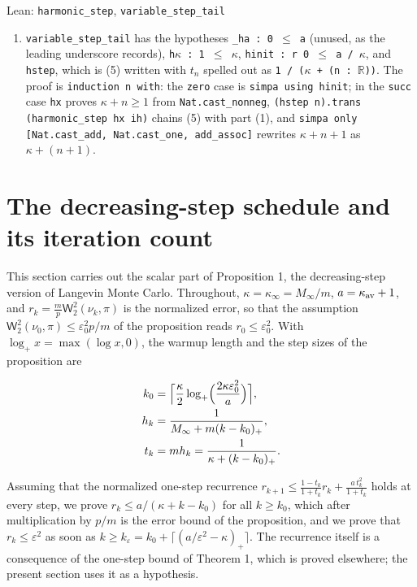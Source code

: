 \documentclass[11pt,a4paper]{report}
\begin{document}
\begin{leanbox}{Lean: \texttt{harmonic\_\allowbreak{}step}, \texttt{variable\_\allowbreak{}step\_\allowbreak{}tail}}
\begin{enumerate}
\item \texttt{variable\_\allowbreak{}step\_\allowbreak{}tail} has the hypotheses \texttt{\_\allowbreak{}ha : 0 \ensuremath{\le} a} (unused, as the leading underscore records), \texttt{h\ensuremath{\kappa} : 1 \ensuremath{\le} \ensuremath{\kappa}}, \texttt{hinit : r 0 \ensuremath{\le} a /\allowbreak{} \ensuremath{\kappa}}, and \texttt{hstep}, which is (5) written with \(t_n\) spelled out as \texttt{1 /\allowbreak{} (\ensuremath{\kappa} + (n : \ensuremath{\mathbb R}))}. The proof is \texttt{induction n with}: the \texttt{zero} case is \texttt{simpa using hinit}; in the \texttt{succ} case \texttt{hx} proves \(\kappa+n\ge1\) from \texttt{Nat.\allowbreak{}cast\_\allowbreak{}nonneg}, \texttt{(hstep n).\allowbreak{}trans (harmonic\_\allowbreak{}step hx ih)} chains (5) with part (1), and \texttt{simpa only [Nat.\allowbreak{}cast\_\allowbreak{}add, Nat.\allowbreak{}cast\_\allowbreak{}one, add\_\allowbreak{}assoc]} rewrites \(\kappa+n+1\) as \(\kappa+(n+1)\).

\end{enumerate}
\end{leanbox}
\section{\texorpdfstring{The decreasing-step schedule and its iteration count}{The decreasing-step schedule and its iteration count}}
\label{proof-module-AverageLMC-Complexity-lean}


This section carries out the scalar part of Proposition 1, the decreasing-step version of Langevin Monte Carlo. Throughout, \(\kappa=\kappa_\infty=M_\infty/m\), \(a=\kappa_{\rm av}+1\), and \(r_k=\frac mp\mathsf W_2^2(\nu_k,\pi)\) is the normalized error, so that the assumption \(\mathsf W_2^2(\nu_0,\pi)\le\varepsilon_0^2p/m\) of the proposition reads \(r_0\le\varepsilon_0^2\). With \(\log_+x=\max(\log x,0)\), the warmup length and the step sizes of the proposition are


\[\begin{aligned}
k_0&=\Bigl\lceil\frac\kappa2\log_+\Bigl(\frac{2\kappa\varepsilon_0^2}{a}\Bigr)\Bigr\rceil,\\
h_k&=\frac1{M_\infty+m(k-k_0)_+},\\
t_k&=mh_k=\frac1{\kappa+(k-k_0)_+}.
\end{aligned}\]


Assuming that the normalized one-step recurrence \(r_{k+1}\le\frac{1-t_k}{1+t_k}r_k+\frac{a\,t_k^2}{1+t_k}\) holds at every step, we prove \(r_k\le a/(\kappa+k-k_0)\) for all \(k\ge k_0\), which after multiplication by \(p/m\) is the error bound of the proposition, and we prove that \(r_k\le\varepsilon^2\) as soon as \(k\ge k_\varepsilon=k_0+\lceil(a/\varepsilon^2-\kappa)_+\rceil\). The recurrence itself is a consequence of the one-step bound of Theorem 1, which is proved elsewhere; the present section uses it as a hypothesis.
\end{document}
